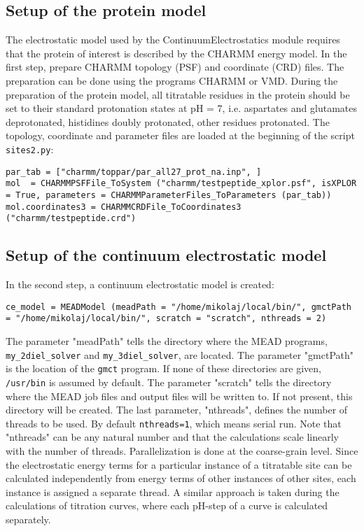 \documentclass[a4paper,11pt]{article}
\newcommand{\modulename}{ContinuumElectrostatics\xspace}
\begin{document}
{\subsection{Setup of the protein model}
The electrostatic model used by the \modulename module requires that the protein
of interest is described by the CHARMM energy model\cite{MacKerell1998}.
%
In the first step, prepare CHARMM topology (PSF) and coordinate (CRD) files.
%
The preparation can be done using the programs CHARMM\cite{CHARMM_Brooks1983}
or VMD\cite{VMD1996}.
%
During the preparation of the protein model, all titratable residues in the protein
should be set to their standard protonation states at pH = 7, i.e. aspartates
and glutamates deprotonated, histidines doubly protonated, other residues
protonated.
%
The topology, coordinate and parameter files are loaded at the
beginning of the script \texttt{sites2.py}:

{\footnotesize \begin{lstlisting}
par_tab = ["charmm/toppar/par_all27_prot_na.inp", ]
mol  = CHARMMPSFFile_ToSystem ("charmm/testpeptide_xplor.psf", isXPLOR = True, parameters = CHARMMParameterFiles_ToParameters (par_tab))
mol.coordinates3 = CHARMMCRDFile_ToCoordinates3 ("charmm/testpeptide.crd")
\end{lstlisting} }


\subsection{Setup of the continuum electrostatic model}
In the second step, a continuum electrostatic model is created:

{\footnotesize \begin{lstlisting}
ce_model = MEADModel (meadPath = "/home/mikolaj/local/bin/", gmctPath = "/home/mikolaj/local/bin/", scratch = "scratch", nthreads = 2)
\end{lstlisting} }

\bigskip
The parameter "meadPath" tells the directory where the MEAD programs,
\texttt{my\_2diel\_solver} and \texttt{my\_3diel\_solver}, are located.
%
The parameter "gmctPath" is the location of the \texttt{gmct} program.
%
If none of these directories are given, \texttt{/usr/bin} is assumed
by default.
%
The parameter "scratch" tells the directory where the MEAD job files
and output files will be written to.
%
If not present, this directory will be created.
%
The last parameter, "nthreads", defines the number of threads to be used.
%
By default \texttt{nthreads=1}, which means serial run.
%
Note that "nthreads" can be any natural number and that the calculations
scale linearly with the number of threads.
%
Parallelization is done at the coarse-grain level.
%
Since the electrostatic energy terms for a particular instance of a titratable
site can be calculated independently from energy terms of other instances of other
sites, each instance is assigned a separate thread.
%
A similar approach is taken during the calculations of titration curves,
where each pH-step of a curve is calculated separately.


}
\end{document}
